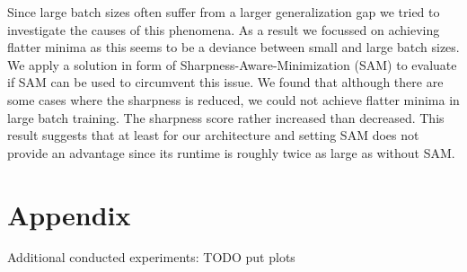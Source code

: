 \documentclass[10pt,conference,compsocconf]{IEEEtran}
\begin{document}
Since large batch sizes often suffer from a larger generalization gap we tried to investigate the causes of this phenomena. As a result we focussed on achieving flatter minima as this seems to be a deviance between small and large batch sizes. We apply a solution in form of Sharpness-Aware-Minimization (SAM) to evaluate if SAM can be used to circumvent this issue. We found that although there are some cases where the sharpness is reduced, we could not achieve flatter minima in large batch training. The sharpness score rather increased than decreased. This result suggests that at least for our architecture and setting SAM does not provide an advantage since its runtime is roughly twice as large as without SAM.

\section*{Appendix}
\label{sec:appendix}
Additional conducted experiments:
TODO put plots

\newpage


\end{document}
